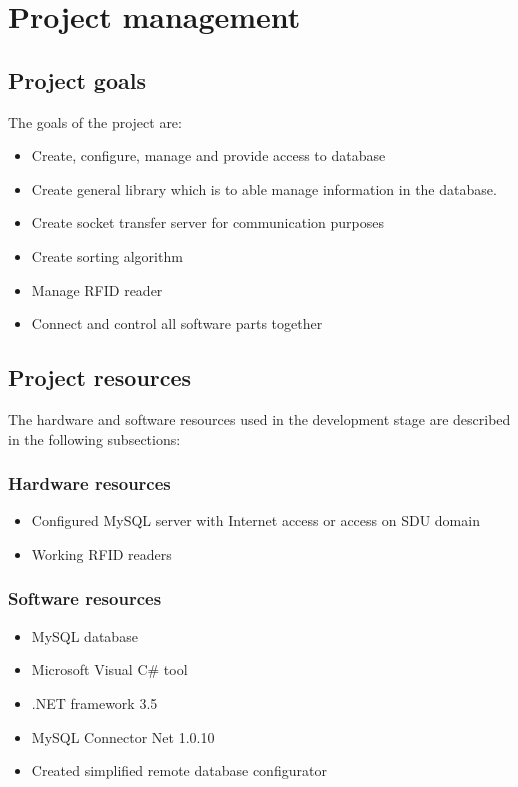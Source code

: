%
\section{Project management}

\subsection{Project goals}

The goals of the project are:

\begin{itemize}
	\item Create, configure, manage and provide access to database
	\item Create general library which is to able manage information in the database.
	\item Create socket transfer server for communication purposes
	\item Create sorting algorithm
	\item Manage RFID reader
	\item Connect and control all software parts together
\end{itemize}

\subsection{Project resources}

The hardware and software resources used in the development stage are described in the following subsections:

\subsubsection{Hardware resources}
\begin{itemize}
	\item Configured MySQL server with Internet access or access on SDU domain
	\item Working RFID readers
\end{itemize}

\subsubsection{Software resources}
\begin{itemize}
	\item MySQL database
	\item Microsoft Visual C\# tool
	\item .NET framework 3.5
	\item MySQL Connector Net 1.0.10
	\item Created simplified remote database configurator
\end{itemize}

